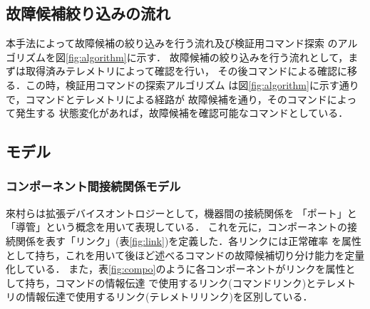 \documentclass[11pt]{jsarticle}%
\begin{document}
\begin{multicols}{2}
\subsection{故障候補絞り込みの流れ}
\vspace{-1zh}
本手法によって故障候補の絞り込みを行う流れ及び検証用コマンド探索
のアルゴリズムを図\ref{fig:algorithm}に示す．
故障候補の絞り込みを行う流れとして，まずは取得済みテレメトリによって確認を行い，
その後コマンドによる確認に移る．この時，検証用コマンドの探索アルゴリズム
は図\ref{fig:algorithm}に示す通りで，コマンドとテレメトリによる経路が
故障候補を通り，そのコマンドによって発生する
状態変化があれば，故障候補を確認可能なコマンドとしている．%
\vspace{-1zh}
\subsection{モデル}
  \vspace{-1zh}
\subsubsection{コンポーネント間接続関係モデル}
來村ら\cite{Kitamura01}は拡張デバイスオントロジーとして，機器間の接続関係を
「ポート」と「導管」という概念を用いて表現している．
これを元に，コンポーネントの接続関係を表す「リンク」(表\ref{fig:link})を定義した．各リンクには正常確率
を属性として持ち，これを用いて後ほど述べるコマンドの故障候補切り分け能力を定量化している．
また，表\ref{fig:compo}のように各コンポーネントがリンクを属性として持ち，コマンドの情報伝達
で使用するリンク(コマンドリンク)とテレメトリの情報伝達で使用するリンク(テレメトリリンク)を区別している．
\vspace{-1zh}

\end{multicols}
\end{document}
